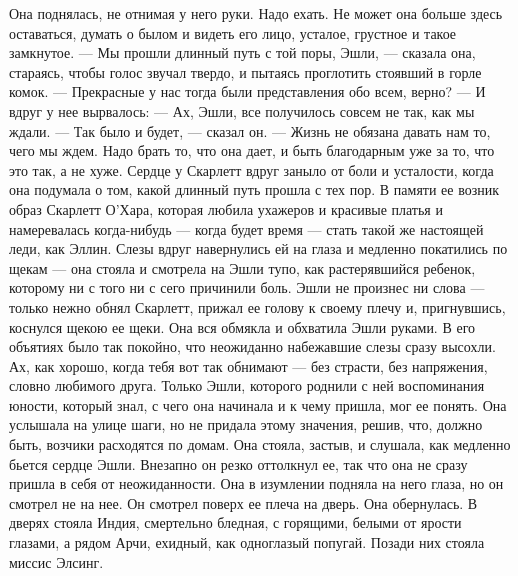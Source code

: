 Она поднялась, не отнимая у него руки. Надо ехать. Не может она больше здесь оставаться, думать о былом и видеть его лицо, усталое, грустное и такое замкнутое.
— Мы прошли длинный путь с той поры, Эшли, — сказала она, стараясь, чтобы голос звучал твердо, и пытаясь проглотить стоявший в горле комок. — Прекрасные у нас тогда были представления обо всем, верно? — И вдруг у нее вырвалось: — Ах, Эшли, все получилось совсем не так, как мы ждали.
— Так было и будет, — сказал он. — Жизнь не обязана давать нам то, чего мы ждем. Надо брать то, что она дает, и быть благодарным уже за то, что это так, а не хуже.
Сердце у Скарлетт вдруг заныло от боли и усталости, когда она подумала о том, какой длинный путь прошла с тех пор. В памяти ее возник образ Скарлетт О’Хара, которая любила ухажеров и красивые платья и намеревалась когда-нибудь — когда будет время — стать такой же настоящей леди, как Эллин.
Слезы вдруг навернулись ей на глаза и медленно покатились по щекам — она стояла и смотрела на Эшли тупо, как растерявшийся ребенок, которому ни с того ни с сего причинили боль. Эшли не произнес ни слова — только нежно обнял Скарлетт, прижал ее голову к своему плечу и, пригнувшись, коснулся щекою ее щеки. Она вся обмякла и обхватила Эшли руками. В его объятиях было так покойно, что неожиданно набежавшие слезы сразу высохли. Ах, как хорошо, когда тебя вот так обнимают — без страсти, без напряжения, словно любимого друга. Только Эшли, которого роднили с ней воспоминания юности, который знал, с чего она начинала и к чему пришла, мог ее понять.
Она услышала на улице шаги, но не придала этому значения, решив, что, должно быть, возчики расходятся по домам. Она стояла, застыв, и слушала, как медленно бьется сердце Эшли. Внезапно он резко оттолкнул ее, так что она не сразу пришла в себя от неожиданности. Она в изумлении подняла на него глаза, но он смотрел не на нее. Он смотрел поверх ее плеча на дверь.
Она обернулась. В дверях стояла Индия, смертельно бледная, с горящими, белыми от ярости глазами, а рядом Арчи, ехидный, как одноглазый попугай. Позади них стояла миссис Элсинг.




